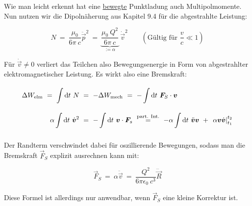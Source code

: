 Wie man leicht erkennt hat eine \underline{bewegte} Punktladung auch Multipolmomente. Nun nutzen wir die Dipolnäherung aus Kapitel 9.4 für die abgestrahlte Leistung:

\begin{equation*}
N  \ = \  \frac{\mu_0}{6\pi \ c} \ddot{\vec{p}}^2  \ = \  \underbrace{\frac{\mu_0 \ Q^2}{6\pi \ c}}_{:=\alpha} \ \dot{\vec{v}}^2 \qquad \left(\text{Gültig für } \frac{v}{c}\ll 1\right)
\end{equation*}

Für $\dot{\vec{v}}\neq 0$ verliert das Teilchen also Bewegungsenergie in Form von abgestrahlter elektromagnetischer Leistung. Es wirkt also eine Bremskraft:

\begin{align*}
\Delta W_{\text{elm}}  \ = \ \Int{}{}{t} N  \ &= \ - \Delta W_{\text{mech}}  \ = \  - \Int{}{}{t} \vec{F}_S\cdot\vec{v}\\
\alpha \Int{}{}{t}\dot{\vec{v}}^2  \ &= \ - \Int{}{}{t}\vec{v}\cdot\vec{F}_s \ \overset{\text{part. Int.}}{=} \ - \alpha\Int{}{}{t}\ddot{\vec{v}}\vec{v} \ + \ \left.\alpha\vec{v}\dot{\vec{v}}\right|^{t_2}_{t_1} 
\end{align*}

Der Randterm verschwindet dabei für oszillierende Bewegungen, sodass man die Bremskraft $\vec{F}_S$ explizit ausrechnen kann mit:

\begin{equation*}
\vec{F}_S \ = \ \alpha \ddot{\vec{v}}  \ = \ \frac{Q^2}{6\pi\epsilon_0 \ c^3} \dddot{\vec{R}}
\end{equation*}

Diese Formel ist allerdings nur anwendbar, wenn $\vec{F}_S$ eine kleine Korrektur ist.